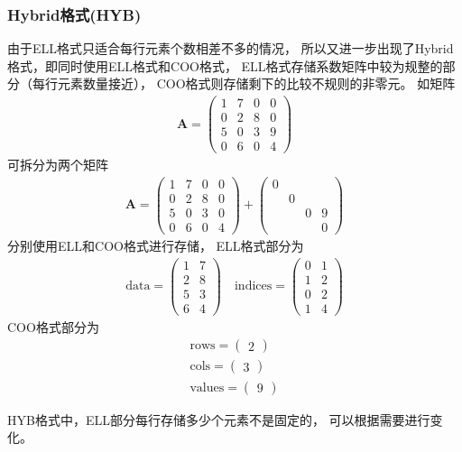 \subsubsection{Hybrid格式(HYB)}
由于ELL格式只适合每行元素个数相差不多的情况，
所以又进一步出现了Hybrid格式，即同时使用ELL格式和COO格式，
ELL格式存储系数矩阵中较为规整的部分（每行元素数量接近），
COO格式则存储剩下的比较不规则的非零元。\cite{bell2008spmv}
如矩阵
\begin{align*}
\bm{A}=\begin{pmatrix}
1 & 7 & 0 & 0\\
0 & 2 & 8 & 0\\
5 & 0 & 3 & 9\\
0 & 6 & 0 & 4
\end{pmatrix}
\end{align*}
可拆分为两个矩阵
\begin{align*}
\bm{A}=\begin{pmatrix}
1 & 7 & 0 & 0\\
0 & 2 & 8 & 0\\
5 & 0 & 3 & 0\\
0 & 6 & 0 & 4
\end{pmatrix}
+
\begin{pmatrix}
0 &  &  & \\
 & 0 &  & \\
 &  & 0 & 9\\
 &  &  & 0
\end{pmatrix}
\end{align*}
分别使用ELL和COO格式进行存储，
ELL格式部分为
\begin{align*}
\mathrm{data}=\begin{pmatrix}
1 & 7\\
2 & 8\\
5 & 3\\
6 & 4
\end{pmatrix}
\quad
\mathrm{indices}=\begin{pmatrix}
0 & 1\\
1 & 2\\
0 & 2\\
1 & 4
\end{pmatrix}
\end{align*}
COO格式部分为
\begin{align*}
\mathrm{rows}=\begin{pmatrix}
2
\end{pmatrix}
\\
\mathrm{cols}=\begin{pmatrix}
3
\end{pmatrix}
\\
\mathrm{values}=\begin{pmatrix}
9
\end{pmatrix}
\end{align*}

HYB格式中，ELL部分每行存储多少个元素不是固定的，
可以根据需要进行变化。

